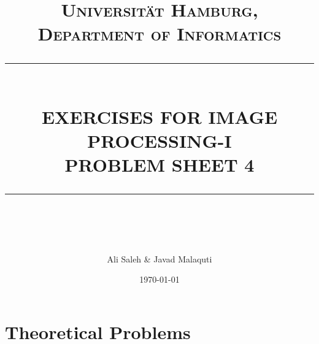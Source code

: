 \documentclass[paper=a4, fontsize=11pt]{scrartcl} %
\numberwithin{equation}{section} %
\numberwithin{figure}{section} %
\numberwithin{table}{section} %
\begin{document}
\newcommand{\horrule}[1]{\rule{\linewidth}{#1}} %

\title{	
\normalfont \normalsize 
\textsc{Universit\"{a}t Hamburg, Department of Informatics} \\ [25pt] %
\horrule{0.5pt} \\[0.4cm] %
EXERCISES FOR IMAGE PROCESSING-I \\PROBLEM SHEET 4 \\ %
\horrule{2pt} \\[0.5cm] %
}

\author{Ali Saleh \& Javad Malaquti} %

\date{\normalsize\today} %


\maketitle %


\section{Theoretical Problems}
\end{document}
